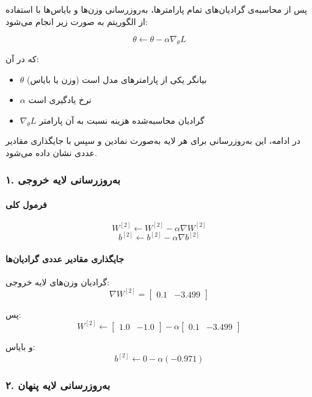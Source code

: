 \documentclass{article}
\begin{document}
پس از محاسبه‌ی گرادیان‌های تمام پارامترها، به‌روزرسانی وزن‌ها و بایاس‌ها با استفاده از الگوریتم
به صورت زیر انجام می‌شود:

\[
\theta \leftarrow \theta - \alpha \nabla_{\theta} L
\]

که در آن:
\begin{itemize}
	\item \(\theta\) بیانگر یکی از پارامترهای مدل است (وزن یا بایاس)
	\item \(\alpha\) نرخ یادگیری است
	\item \(\nabla_{\theta} L\) گرادیان محاسبه‌شده هزینه نسبت به آن پارامتر
\end{itemize}

در ادامه، این به‌روزرسانی برای هر لایه به‌صورت نمادین و سپس با جایگذاری مقادیر عددی نشان داده می‌شود.

\subsubsection*{۱. به‌روزرسانی لایه خروجی}

\paragraph{فرمول کلی}
\[
W^{[2]} \leftarrow W^{[2]} - \alpha \nabla W^{[2]}
\]
\[
b^{[2]} \leftarrow b^{[2]} - \alpha \nabla b^{[2]}
\]

\paragraph{جایگذاری مقادیر عددی گرادیان‌ها}

گرادیان وزن‌های لایه خروجی:
\[
\nabla W^{[2]}=
\begin{bmatrix}
	0.1 & -3.499
\end{bmatrix}
\]

پس:
\[
W^{[2]} \leftarrow
\begin{bmatrix}
	1.0 & -1.0
\end{bmatrix}
-
\alpha
\begin{bmatrix}
	0.1 & -3.499
\end{bmatrix}
\]

و بایاس:
\[
b^{[2]} \leftarrow
0
-
\alpha(-0.971)
\]

\subsubsection*{۲. به‌روزرسانی لایه پنهان}
\end{document}
